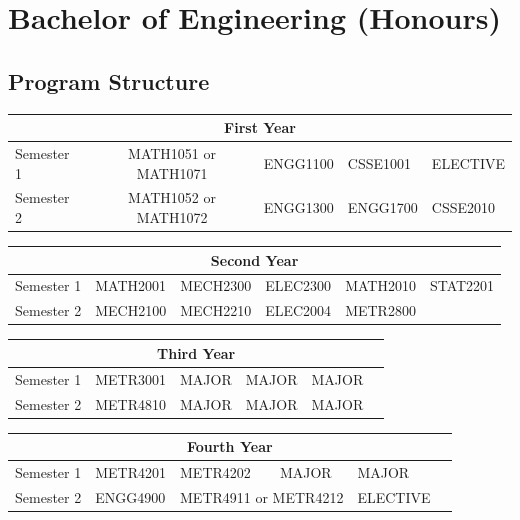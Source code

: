 \documentclass[a4paper,12pt]{report}
\begin{document}
\section{Bachelor of Engineering (Honours)}
\subsection{Program Structure}
\renewcommand{\arraystretch}{1.5}
\begin{table}[H]
    \centering
    \begin{tabular}{| m{6em} | m{5em} m{5em} m{5em} m{5em} m{5em} |}
        \hline
        \multicolumn{6}{|c|}{\bfseries First Year} \\
        \hline
        Semester 1 & \multicolumn{2}{c}{MATH1051 or MATH1071} & ENGG1100 & CSSE1001 & ELECTIVE \\
        Semester 2 & \multicolumn{2}{c}{MATH1052 or MATH1072} & ENGG1300 & ENGG1700 & CSSE2010 \\
        \hline
    \end{tabular}
\end{table}
\begin{table}[H]
    \centering
    \begin{tabular}{| m{6em} | m{5em} m{5em} m{5em} m{5em} m{5em} |}
        \hline
        \multicolumn{6}{|c|}{\bfseries Second Year} \\
        \hline
        Semester 1 & MATH2001 & MECH2300 & ELEC2300 & MATH2010 & STAT2201 \\
        Semester 2 & MECH2100 & MECH2210 & ELEC2004 & METR2800 & \\
        \hline
    \end{tabular}
\end{table}
\begin{table}[H]
    \centering
    \begin{tabular}{| m{6em} | m{5em} m{5em} m{5em} m{5em} m{5em} |}
        \hline
        \multicolumn{6}{|c|}{\bfseries Third Year} \\
        \hline
        Semester 1 & METR3001 & MAJOR & MAJOR & MAJOR & \\
        Semester 2 & METR4810 & MAJOR & MAJOR & MAJOR & \\
        \hline
    \end{tabular}
\end{table}
\begin{table}[H]
    \centering
    \begin{tabular}{| m{6em} | m{5em} m{5em} m{5em} m{5em} m{5em} |}
        \hline
        \multicolumn{6}{|c|}{\bfseries Fourth Year} \\
        \hline
        Semester 1 & METR4201 & METR4202 & MAJOR & MAJOR & \\
        Semester 2 & ENGG4900 & \multicolumn{2}{c}{METR4911 or METR4212} & ELECTIVE & \\
        \hline
    \end{tabular}
\end{table}
\renewcommand{\arraystretch}{1}
\end{document}
